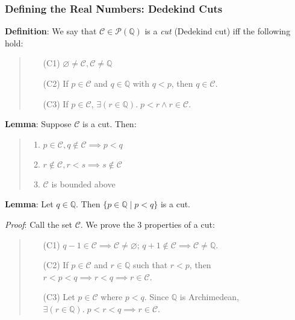 \documentclass[11pt]{article}
\begin{document}
\subsubsection{Defining the Real Numbers: Dedekind Cuts}

\textbf{Definition}: We say that $\mathcal{C} \in \mathcal{P}(\mathbb{Q})$ is a \emph{cut} (Dedekind cut) iff the following hold:
\begin{quote}\vspace{-0.3cm}
	\begin{enumerate}
	\item[(C1)] $\varnothing \neq \mathcal{C}, \mathcal{C} \neq \mathbb{Q}$
	\item[(C2)] If $p \in \mathcal{C}$ and $q \in \mathbb{Q}$ with $q < p$, then $q \in \mathcal{C}$.
	\item[(C3)] If $p \in \mathcal{C}$, $\exists (r \in \mathbb{Q}).\; p < r \land r \in \mathcal{C}$.
	\end{enumerate}
\end{quote}

\textbf{Lemma}: Suppose $\mathcal{C}$ is a cut. Then:
\begin{quote}\vspace{-0.3cm}
	\begin{enumerate}
	\item $p \in \mathcal{C}, q \notin \mathcal{C} \implies p < q$
	\item$r \notin \mathcal{C}, r < s \implies s \notin \mathcal{C}$
	\item $\mathcal{C}$ is bounded above
	\end{enumerate}
\end{quote}

\textbf{Lemma}: Let $q \in \mathbb{Q}$. Then $\{p \in \mathbb{Q} \;|\; p < q\}$ is a cut.

\emph{Proof}: Call the set $\mathcal{C}$. We prove the 3 properties of a cut:
\begin{quote}\vspace{-0.3cm}
	\begin{enumerate}
	\item[(C1)] $q - 1 \in \mathcal{C} \implies \mathcal{C} \neq \varnothing$; $q + 1 \notin \mathcal{C} \implies \mathcal{C} \neq \mathbb{Q}$.
	\item[(C2)] If $p \in \mathcal{C}$ and $r \in \mathbb{Q}$ such that $r < p$, then $r < p < q \implies r < q \implies r \in \mathcal{C}$.
	\item[(C3)] Let $p \in \mathcal{C}$ where $p < q$. Since $\mathbb{Q}$ is Archimedean, $\exists (r \in \mathbb{Q}).\; p < r < q \implies r \in \mathcal{C}$.
	\end{enumerate}
\end{quote}
\end{document}
